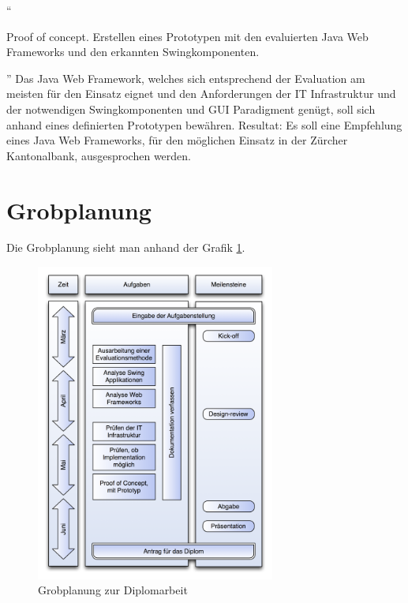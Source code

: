   ``\begin{itshape}Proof of concept. Erstellen eines Prototypen mit den
  evaluierten Java Web Frameworks und den erkannten
  Swingkomponenten.\end{itshape}''
  \newline
  \newline
  \noindent
  Das Java Web Framework, welches sich entsprechend der Evaluation am meisten
  für den Einsatz eignet und den Anforderungen der IT Infrastruktur und der
  notwendigen Swingkomponenten und GUI Paradigment genügt, soll sich anhand
  eines definierten Prototypen bewähren.
  \newline
  \newline
  \noindent
  Resultat: Es soll eine Empfehlung eines Java Web Frameworks, für den
  möglichen Einsatz in der Zürcher Kantonalbank, ausgesprochen werden.
  
  \section{Grobplanung}
  
  Die Grobplanung sieht man anhand der Grafik \ref{img:grobplanung}.
  
  \begin{figure}[ht]
    \begin{center}
      \includegraphics[width=0.7\textwidth]{./image/grobplanung.png}
      \caption{Grobplanung zur Diplomarbeit}
      \label{img:grobplanung}
    \end{center}
  \end{figure}
  
